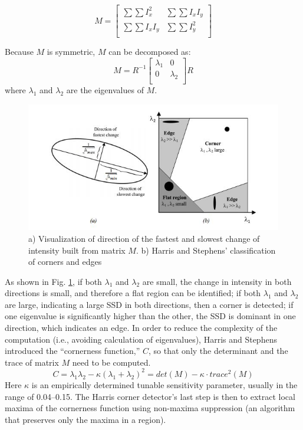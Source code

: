 \documentclass[twoside]{article}
\begin{document}
\begin{equation}
M =
\begin{bmatrix}
\sum \sum I_x^2 & \sum \sum I_x I_y \\
\sum \sum I_x I_y & \sum \sum I_y^2 \\
\end{bmatrix}
\end{equation}

Because $M$ is symmetric, $M$ can be decomposed as:
\begin{equation}
M =
R^{-1}
\begin{bmatrix}
\lambda_1 & 0\\
0 & \lambda_2\\
\end{bmatrix}
R
\end{equation}
where $\lambda_1$ and $\lambda_2$ are the eigenvalues of $M$.
\begin{figure}
  \centering
  \includegraphics{harris.JPG}
    \caption{a) Visualization of direction of the fastest and slowest change of intensity built from matrix $M$. b) Harris and Stephens' classification of corners and edges \cite{SNS}}
    \label{harris}
\end{figure}

As shown in Fig. \ref{harris}, if both $\lambda_1$ and $\lambda_2$ are small, the change in intensity in both directions is small, and therefore a flat region can be identified; if both $\lambda_1$ and $\lambda_2$ are large, indicating a large SSD in both directions, then a corner is detected; if one eigenvalue is significantly higher than the other, the SSD is dominant in one direction, which indicates an edge. In order to reduce the complexity of the computation (i.e., avoiding calculation of eigenvalues), Harris and Stephens introduced the ``cornerness function,'' $C$, so that only the determinant and the trace of matrix $M$ need to be computed.
\begin{equation}
C = \lambda_1 \lambda_2 - \kappa(\lambda_1+\lambda_2)^2 = det(M) - \kappa\cdot trace^2(M)
\end{equation}
Here $\kappa$ is an empirically determined tunable sensitivity parameter, usually in the range of 0.04--0.15. The Harris corner detector's last step is then to extract local maxima of the cornerness function using non-maxima suppression (an algorithm that preserves only the maxima in a region). \\
\end{document}
